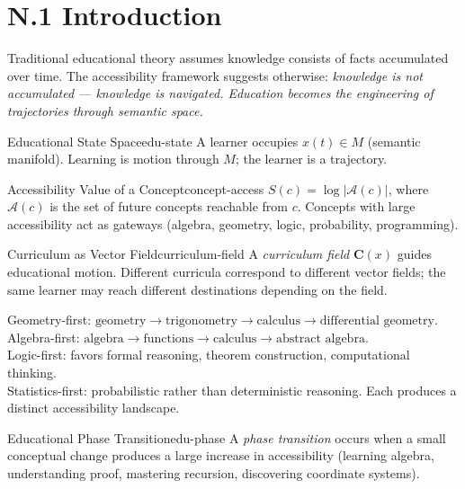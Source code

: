 
\section*{N.1 Introduction}

Traditional educational theory assumes knowledge consists of facts
accumulated over time. The accessibility framework suggests otherwise:
\emph{knowledge is not accumulated — knowledge is navigated.
Education becomes the engineering of trajectories through semantic space.}

\begin{definition}{Educational State Space}{edu-state}
  A learner occupies $x(t) \in M$ (semantic manifold).
  Learning is motion through $M$; the learner is a trajectory.
\end{definition}

\begin{definition}{Accessibility Value of a Concept}{concept-access}
  $S(c) = \log |\mathcal{A}(c)|$, where $\mathcal{A}(c)$ is the set of
  future concepts reachable from $c$. Concepts with large accessibility
  act as gateways (algebra, geometry, logic, probability, programming).
\end{definition}

\begin{definition}{Curriculum as Vector Field}{curriculum-field}
  A \emph{curriculum field} $\mathbf{C}(x)$ guides educational motion.
  Different curricula correspond to different vector fields; the same
  learner may reach different destinations depending on the field.
\end{definition}

\begin{example}
  Geometry-first: $\text{geometry} \to \text{trigonometry} \to
  \text{calculus} \to \text{differential geometry}$.\\
  Algebra-first: $\text{algebra} \to \text{functions} \to
  \text{calculus} \to \text{abstract algebra}$.\\
  Logic-first: favors formal reasoning, theorem construction,
  computational thinking.\\
  Statistics-first: probabilistic rather than deterministic reasoning.
  Each produces a distinct accessibility landscape.
\end{example}

\begin{definition}{Educational Phase Transition}{edu-phase}
  A \emph{phase transition} occurs when a small conceptual change produces
  a large increase in accessibility (learning algebra, understanding proof,
  mastering recursion, discovering coordinate systems).
\end{definition}

